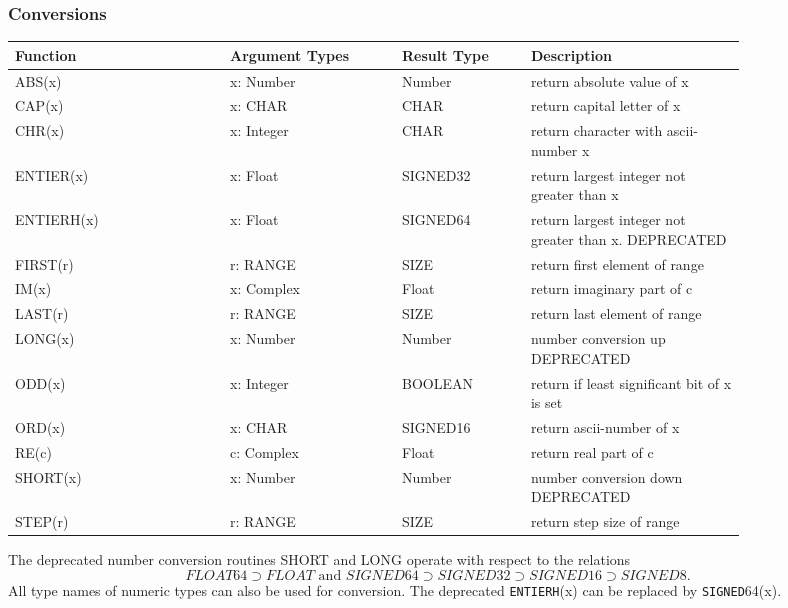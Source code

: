 \documentclass[a4wide,11pt]{article}
\newcommand{\SIGNED}{\lstinline"SIGNED"}
\newcommand{\ENTIERH}{\lstinline"ENTIERH"}
\begin{document}
\subsubsection{Conversions}
\begin{longtable}{|p{0.25\linewidth}|p{0.2\linewidth}|p{0.15\linewidth}|p{0.25\linewidth}|}
\hline
Function & Argument Types & Result Type & Description \\
\hline\hline
\endhead
ABS(x) & x: Number & Number & return absolute value of x\\
CAP(x) & x: CHAR & CHAR & return capital letter of x\\
CHR(x) & x: Integer & CHAR & return character with ascii-number x\\
ENTIER(x) & x: Float & SIGNED32 & return largest integer not greater than x\\
ENTIERH(x) & x: Float & SIGNED64 & return largest integer not greater than x. DEPRECATED\\
FIRST(r) & r: RANGE & SIZE & return first element of range \\
IM(x) & x: Complex & Float & return imaginary part of c \\
LAST(r) & r: RANGE & SIZE & return last element of range \\
LONG(x) & x: Number & Number & number conversion up DEPRECATED \\
ODD(x) & x: Integer & BOOLEAN & return if least significant bit of x is set\\
ORD(x) & x: CHAR & SIGNED16 & return ascii-number of x\\
RE(c) & c: Complex & Float & return real part of c \\
SHORT(x) & x: Number & Number & number conversion down DEPRECATED \\
STEP(r) & r: RANGE & SIZE & return step size of range \\
\hline
\end{longtable}

The deprecated number conversion routines SHORT and LONG operate with respect to the relations
$$FLOAT64 \supset FLOAT \mbox{ and } SIGNED64 \supset SIGNED32 \supset SIGNED16 \supset SIGNED8.$$
All type names of numeric types can also be used for conversion.
The deprecated \ENTIERH(x) can be replaced by \SIGNED64(x).
\end{document}
